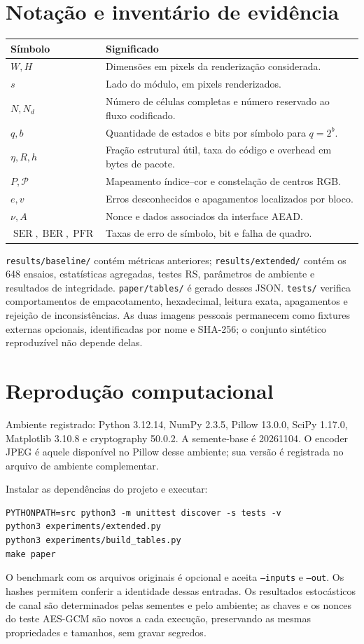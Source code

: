 \documentclass[11pt,a4paper]{article}
\newcommand{\SER}{\operatorname{SER}}
\newcommand{\BER}{\operatorname{BER}}
\newcommand{\PFR}{\operatorname{PFR}}
\begin{document}
\clearpage
\appendix
\section{Notação e inventário de evidência}
\begin{longtable}{p{.20\linewidth}p{.72\linewidth}}
\toprule Símbolo & Significado\\\midrule
$W,H$ & Dimensões em pixels da renderização considerada.\\
$s$ & Lado do módulo, em pixels renderizados.\\
$N,N_d$ & Número de células completas e número reservado ao fluxo codificado.\\
$q,b$ & Quantidade de estados e bits por símbolo para $q=2^b$.\\
$\eta,R,h$ & Fração estrutural útil, taxa do código e overhead em bytes de pacote.\\
$P,\mathcal P$ & Mapeamento índice--cor e constelação de centros RGB.\\
$e,v$ & Erros desconhecidos e apagamentos localizados por bloco.\\
$\nu,A$ & Nonce e dados associados da interface AEAD.\\
$\SER,\BER,\PFR$ & Taxas de erro de símbolo, bit e falha de quadro.\\
\bottomrule
\end{longtable}
\texttt{results/baseline/} contém métricas anteriores; \texttt{results/extended/} contém os 648 ensaios, estatísticas agregadas, testes RS, parâmetros de ambiente e resultados de integridade. \texttt{paper/tables/} é gerado desses JSON. \texttt{tests/} verifica comportamentos de empacotamento, hexadecimal, leitura exata, apagamentos e rejeição de inconsistências. As duas imagens pessoais permanecem como fixtures externas opcionais, identificadas por nome e SHA-256; o conjunto sintético reproduzível não depende delas.

\section{Reprodução computacional}
Ambiente registrado: Python 3.12.14, NumPy 2.3.5, Pillow 13.0.0, SciPy 1.17.0, Matplotlib 3.10.8 e cryptography 50.0.2. A semente-base é 20261104. O encoder JPEG é aquele disponível no Pillow desse ambiente; sua versão é registrada no arquivo de ambiente complementar.

Instalar as dependências do projeto e executar:
\begin{verbatim}
PYTHONPATH=src python3 -m unittest discover -s tests -v
python3 experiments/extended.py
python3 experiments/build_tables.py
make paper
\end{verbatim}
O benchmark com os arquivos originais é opcional e aceita \texttt{--inputs} e \texttt{--out}. Os hashes permitem conferir a identidade dessas entradas. Os resultados estocásticos de canal são determinados pelas sementes e pelo ambiente; as chaves e os nonces do teste AES-GCM são novos a cada execução, preservando as mesmas propriedades e tamanhos, sem gravar segredos.



\end{document}
